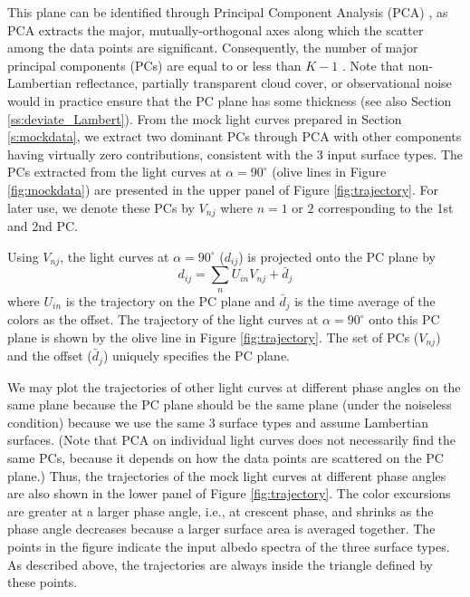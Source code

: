 \documentclass[iop,numberedappendix,apj]{emulateapj}
\begin{document}
This plane can be identified through Principal Component Analysis (PCA) \citep{Cowan2009,Cowan2011}, as PCA extracts the major, mutually-orthogonal axes along which the scatter among the data points are significant. 
Consequently, the number of major principal components (PCs) are equal to or less than $K-1$ \citep{Cowan2011}. 
{\color{red} Note that non-Lambertian reflectance, partially transparent cloud cover, or observational noise would in practice ensure that the PC plane has some thickness (see also Section \ref{ss:deviate_Lambert}).  }
From the mock light curves prepared in Section \ref{s:mockdata}, we extract two dominant PCs through PCA with other components having virtually zero contributions, consistent with the 3 input surface types.  
The PCs extracted from the light curves at $\alpha = 90^{\circ }$ (olive lines in Figure \ref{fig:mockdata}) are presented in the upper panel of Figure \ref{fig:trajectory}. 
For later use, we denote these PCs by $V_{nj}$ where $n=1$ or $2$  corresponding to the 1st and 2nd PC. 

Using $V_{nj}$, the light curves at $\alpha = 90^{\circ }$ ($d_{ij}$) is projected onto the PC plane by
\begin{equation}
d_{ij} = \sum_n U_{in} V_{nj} + \bar d_j
\end{equation}
where $U_{in}$ is the trajectory on the PC plane and $\bar d_j$ is the time average of the colors as the offset. 
The trajectory of the light curves at $\alpha = 90^{\circ }$ onto this PC plane is shown by the olive line in Figure \ref{fig:trajectory}. 
The set of PCs ($V_{nj}$) and the offset ($\bar d_j$) uniquely specifies the PC plane. 

We may plot the trajectories of other light curves at different phase angles on the same plane because the PC plane should be the same plane (under the noiseless condition) because we use the same 3 surface types and assume Lambertian surfaces. 
(Note that PCA on individual light curves does not necessarily find the same PCs, because it depends on how the data points are scattered on the PC plane.)
Thus, the trajectories of the mock light curves at different phase angles are also shown in the lower panel of Figure \ref{fig:trajectory}. 
The color excursions are greater at a larger phase angle, i.e., at crescent phase, and shrinks as the phase angle decreases because a larger surface area is averaged together.  
The points in the figure indicate the input albedo spectra of the three surface types. 
As described above, the trajectories are always inside the triangle defined by these points. 
\end{document}
